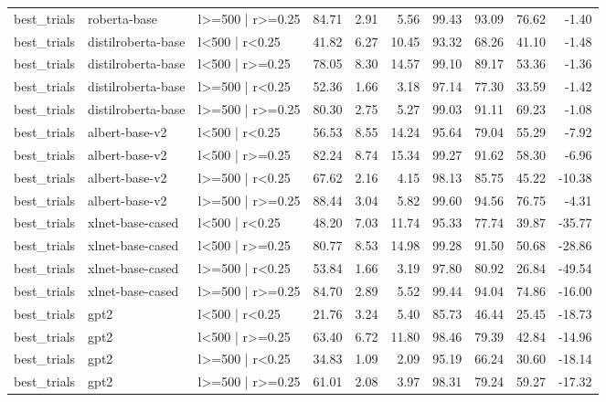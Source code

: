 \begin{tabular}{lllrrrrrrr}
best_trials & roberta-base & l>=500 | r>=0.25 & 84.71 & 2.91 & 5.56 & 99.43 & 93.09 & 76.62 & -1.40 \\
best_trials & distilroberta-base & l<500 | r<0.25 & 41.82 & 6.27 & 10.45 & 93.32 & 68.26 & 41.10 & -1.48 \\
best_trials & distilroberta-base & l<500 | r>=0.25 & 78.05 & 8.30 & 14.57 & 99.10 & 89.17 & 53.36 & -1.36 \\
best_trials & distilroberta-base & l>=500 | r<0.25 & 52.36 & 1.66 & 3.18 & 97.14 & 77.30 & 33.59 & -1.42 \\
best_trials & distilroberta-base & l>=500 | r>=0.25 & 80.30 & 2.75 & 5.27 & 99.03 & 91.11 & 69.23 & -1.08 \\
best_trials & albert-base-v2 & l<500 | r<0.25 & 56.53 & 8.55 & 14.24 & 95.64 & 79.04 & 55.29 & -7.92 \\
best_trials & albert-base-v2 & l<500 | r>=0.25 & 82.24 & 8.74 & 15.34 & 99.27 & 91.62 & 58.30 & -6.96 \\
best_trials & albert-base-v2 & l>=500 | r<0.25 & 67.62 & 2.16 & 4.15 & 98.13 & 85.75 & 45.22 & -10.38 \\
best_trials & albert-base-v2 & l>=500 | r>=0.25 & 88.44 & 3.04 & 5.82 & 99.60 & 94.56 & 76.75 & -4.31 \\
best_trials & xlnet-base-cased & l<500 | r<0.25 & 48.20 & 7.03 & 11.74 & 95.33 & 77.74 & 39.87 & -35.77 \\
best_trials & xlnet-base-cased & l<500 | r>=0.25 & 80.77 & 8.53 & 14.98 & 99.28 & 91.50 & 50.68 & -28.86 \\
best_trials & xlnet-base-cased & l>=500 | r<0.25 & 53.84 & 1.66 & 3.19 & 97.80 & 80.92 & 26.84 & -49.54 \\
best_trials & xlnet-base-cased & l>=500 | r>=0.25 & 84.70 & 2.89 & 5.52 & 99.44 & 94.04 & 74.86 & -16.00 \\
best_trials & gpt2 & l<500 | r<0.25 & 21.76 & 3.24 & 5.40 & 85.73 & 46.44 & 25.45 & -18.73 \\
best_trials & gpt2 & l<500 | r>=0.25 & 63.40 & 6.72 & 11.80 & 98.46 & 79.39 & 42.84 & -14.96 \\
best_trials & gpt2 & l>=500 | r<0.25 & 34.83 & 1.09 & 2.09 & 95.19 & 66.24 & 30.60 & -18.14 \\
best_trials & gpt2 & l>=500 | r>=0.25 & 61.01 & 2.08 & 3.97 & 98.31 & 79.24 & 59.27 & -17.32 \\
\bottomrule
\end{tabular}

